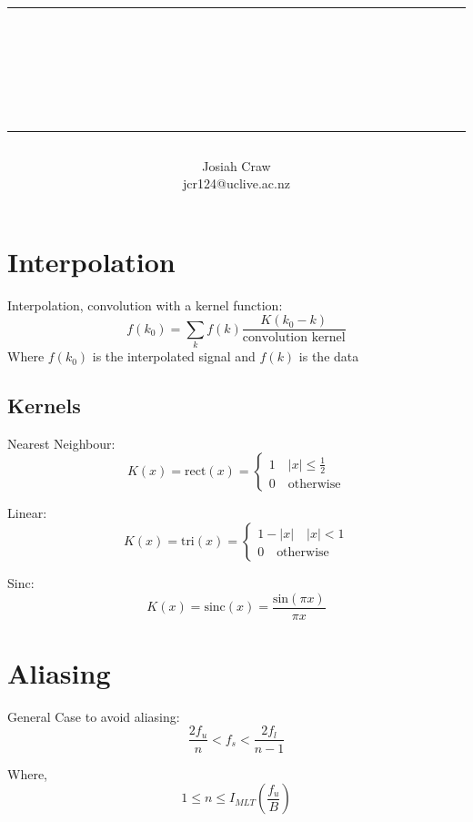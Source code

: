 \documentclass[12pt]{article}
\author{{\LARGE Josiah Craw}\vspace{10pt}\\jcr124@uclive.ac.nz\\}
\title{\rule{\textwidth}{0.8pt} \\ {\huge \textbf{\reportTitle}}\\{\large \subTitle} \rule{\textwidth}{0.8pt}}
\begin{document}
\maketitle
\newpage

\section{Interpolation}
Interpolation, convolution with a kernel function:
\begin{equation}
f(k_0) = \sum_k f(k) \frac{K(k_0-k)}{\textrm{convolution kernel}} 
\end{equation}
Where $f(k_0)$ is the interpolated signal and $f(k)$ is the data

\subsection{Kernels}

Nearest Neighbour:
\begin{equation}
K(x)=\textrm{rect}(x) =
\begin{cases}
    1 \quad |x| \leq \frac{1}{2}\\
    0 \quad \textrm{otherwise}
\end{cases}
\end{equation}

Linear:
\begin{equation}
    K(x)=\textrm{tri}(x) =
    \begin{cases}
        1 - |x| \quad |x| < 1\\
        0 \quad \textrm{otherwise}
    \end{cases}
\end{equation}

Sinc:
\begin{equation}
    K(x) = \textrm{sinc}(x) = \frac{\textrm{sin}(\pi x)}{\pi x}
\end{equation}

\section{Aliasing}
General Case to avoid aliasing:
\begin{equation}
    \frac{2f_u}{n} < f_s < \frac{2f_l}{n-1}
\end{equation}

Where,
\begin{equation}
    1 \leq n \leq I_{MLT}\left(\frac{f_u}{B}\right)
\end{equation}
\end{document}
